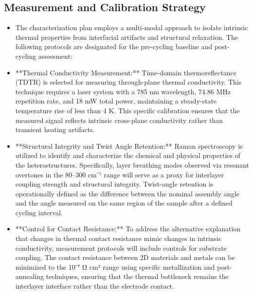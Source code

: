 \documentclass[conference]{IEEEtran}
\begin{document}
\subsection{Measurement and Calibration Strategy}
\begin{itemize}
\item The characterization plan employs a multi-modal approach to isolate intrinsic thermal properties from interfacial artifacts and structural relaxation. The following protocols are designated for the pre-cycling baseline and post-cycling assessment:
\item **Thermal Conductivity Measurement:** Time-domain thermoreflectance (TDTR) is selected for measuring through-plane thermal conductivity. This technique requires a laser system with a 785 nm wavelength, 74.86 MHz repetition rate, and 18 mW total power, maintaining a steady-state temperature rise of less than 4 K. This specific calibration ensures that the measured signal reflects intrinsic cross-plane conductivity rather than transient heating artifacts.
\item **Structural Integrity and Twist Angle Retention:** Raman spectroscopy is utilized to identify and characterize the chemical and physical properties of the heterostructures. Specifically, layer breathing modes observed via resonant overtones in the 80–300 cm⁻¹ range will serve as a proxy for interlayer coupling strength and structural integrity. Twist-angle retention is operationally defined as the difference between the nominal assembly angle and the angle measured on the same region of the sample after a defined cycling interval.
\item **Control for Contact Resistance:** To address the alternative explanation that changes in thermal contact resistance mimic changes in intrinsic conductivity, measurement protocols will include controls for substrate coupling. The contact resistance between 2D materials and metals can be minimized to the 10⁻⁷ Ω cm² range using specific metallization and post-annealing techniques, ensuring that the thermal bottleneck remains the interlayer interface rather than the electrode contact.
\end{itemize}~\cite{cite_26ecaf73d88dfe33,cite_c8ce7e25ee0b4157}
\end{document}
